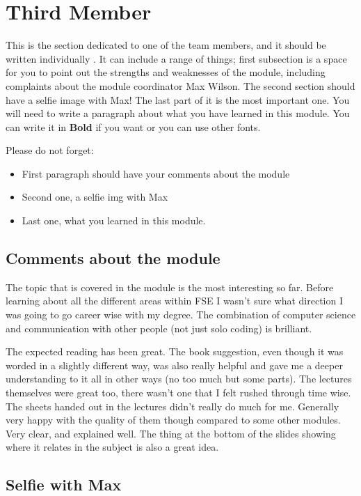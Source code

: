 \section{Third Member}
This is the section dedicated to one of the team members, and it should be written individually . It can include a range of things; first subsection is a space for you to point out the strengths and weaknesses of the module, including complaints about the module coordinator Max Wilson. The second section should have a selfie image with Max! The last part of it is the most important one. You will need to write a paragraph about what you have learned in this module. You can write it in \textbf{Bold} if you want or you can use other fonts. 

Please do not forget:
\begin{itemize}
	\item First paragraph should have your comments about the module
	\item Second one, a selfie img with Max
	\item Last one, what you learned in this module.
\end{itemize}

\subsection{Comments about the module}
The topic that is covered in the module is the most interesting so far. Before learning about all the different areas within FSE I wasn't sure what direction I was going to go career wise with my degree. The combination of computer science and communication with other people (not just solo coding) is brilliant.

The expected reading has been great. The book suggestion, even though it was worded in a slightly different way, was also really helpful and gave me a deeper understanding to it all in other ways (no too much but some parts). The lectures themselves were great too, there wasn't one that I felt rushed through time wise. The sheets handed out in the lectures didn't really do much for me. Generally very happy with the quality of them though compared to some other modules. Very clear, and explained well. The thing at the bottom of the slides showing where it relates in the subject is also a great idea.

\subsection{Selfie with Max}

